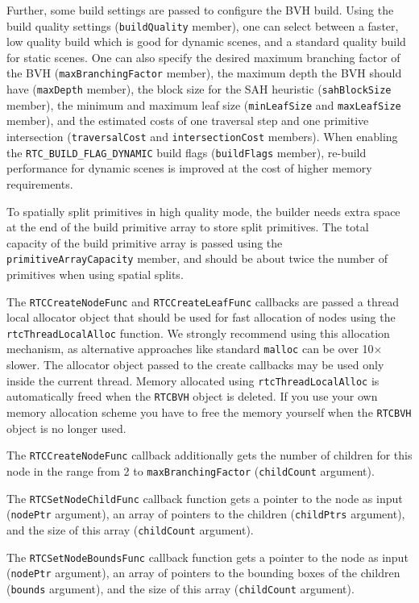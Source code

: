 Further, some build settings are passed to configure the BVH build.
Using the build quality settings (\texttt{buildQuality} member), one can
select between a faster, low quality build which is good for dynamic
scenes, and a standard quality build for static scenes. One can also
specify the desired maximum branching factor of the BVH
(\texttt{maxBranchingFactor} member), the maximum depth the BVH should
have (\texttt{maxDepth} member), the block size for the SAH heuristic
(\texttt{sahBlockSize} member), the minimum and maximum leaf size
(\texttt{minLeafSize} and \texttt{maxLeafSize} member), and the
estimated costs of one traversal step and one primitive intersection
(\texttt{traversalCost} and \texttt{intersectionCost} members). When
enabling the \texttt{RTC\_BUILD\_FLAG\_DYNAMIC} build flags
(\texttt{buildFlags} member), re-build performance for dynamic scenes is
improved at the cost of higher memory requirements.

To spatially split primitives in high quality mode, the builder needs
extra space at the end of the build primitive array to store split
primitives. The total capacity of the build primitive array is passed
using the \texttt{primitiveArrayCapacity} member, and should be about
twice the number of primitives when using spatial splits.

The \texttt{RTCCreateNodeFunc} and \texttt{RTCCreateLeafFunc} callbacks
are passed a thread local allocator object that should be used for fast
allocation of nodes using the \texttt{rtcThreadLocalAlloc} function. We
strongly recommend using this allocation mechanism, as alternative
approaches like standard \texttt{malloc} can be over 10× slower. The
allocator object passed to the create callbacks may be used only inside
the current thread. Memory allocated using \texttt{rtcThreadLocalAlloc}
is automatically freed when the \texttt{RTCBVH} object is deleted. If
you use your own memory allocation scheme you have to free the memory
yourself when the \texttt{RTCBVH} object is no longer used.

The \texttt{RTCCreateNodeFunc} callback additionally gets the number of
children for this node in the range from 2 to
\texttt{maxBranchingFactor} (\texttt{childCount} argument).

The \texttt{RTCSetNodeChildFunc} callback function gets a pointer to the
node as input (\texttt{nodePtr} argument), an array of pointers to the
children (\texttt{childPtrs} argument), and the size of this array
(\texttt{childCount} argument).

The \texttt{RTCSetNodeBoundsFunc} callback function gets a pointer to
the node as input (\texttt{nodePtr} argument), an array of pointers to
the bounding boxes of the children (\texttt{bounds} argument), and the
size of this array (\texttt{childCount} argument).


